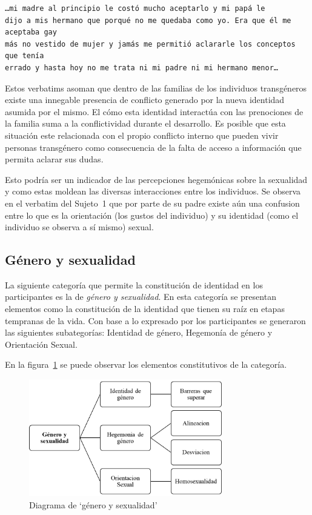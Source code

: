 \begin{verbatim}
…mi madre al principio le costó mucho aceptarlo y mi papá le
dijo a mis hermano que porqué no me quedaba como yo. Era que él me aceptaba gay
más no vestido de mujer y jamás me permitió aclararle los conceptos que tenía
errado y hasta hoy no me trata ni mi padre ni mi hermano menor…
\end{verbatim}

Estos verbatims asoman que dentro de las familias de los individuos transgéneros
existe una innegable presencia de conflicto generado por la nueva identidad
asumida por el mismo. El cómo esta identidad interactúa con las prenociones de
la familia suma a la conflictividad durante el desarrollo. Es posible que esta
situación este relacionada con el propio conflicto interno que pueden vivir
personas transgénero como consecuencia de la falta de acceso a información que
permita aclarar sus dudas.

Esto podría ser un indicador de las percepciones hegemónicas sobre la sexualidad
y como estas moldean las diversas interacciones entre los individuos. Se
observa en el verbatim del Sujeto~1 que por parte de su padre existe aún una
confusion entre lo que es la orientación (los gustos del individuo) y su
identidad (como el individuo se observa a sí mismo) sexual.

\subsection{Género y sexualidad}

La siguiente categoría que permite la constitución de identidad en los
participantes es la de \emph{género y sexualidad}. En esta categoría se
presentan elementos como la constitución de la identidad que tienen su raíz en
etapas tempranas de la vida. Con base a lo expresado por los participantes se
generaron las siguientes subategorías: Identidad de género, Hegemonía de género
y Orientación Sexual.

En la figura~\ref{fig:genero} se puede observar los elementos constitutivos de
la categoría.

\begin{figure}
    \centering
    \includegraphics[width=0.75\textwidth]{genero}
    \caption{Diagrama de ‘género y sexualidad’}\label{fig:genero}
\end{figure}

